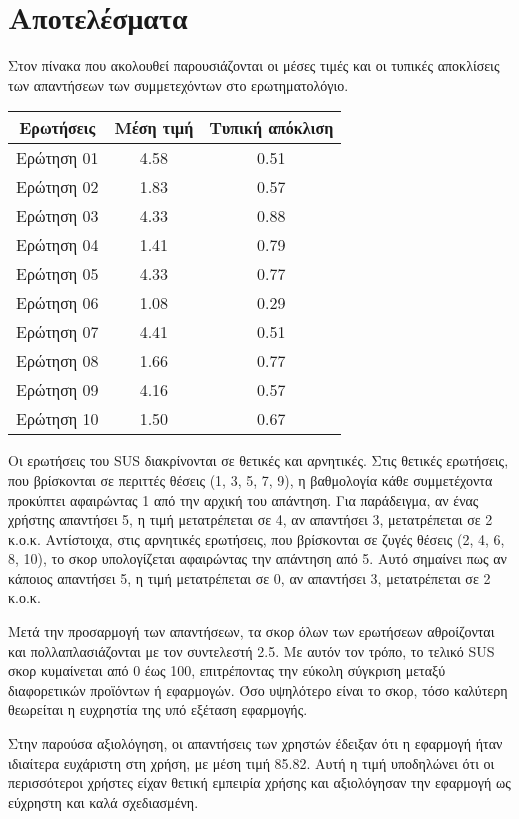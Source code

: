     \section{Αποτελέσματα}
        Στον πίνακα που ακολουθεί παρουσιάζονται οι μέσες τιμές και οι τυπικές αποκλίσεις των απαντήσεων των συμμετεχόντων στο ερωτηματολόγιο.
        \begin{table}[H] \noindent\centering \small
                \begin{tabular}{c|c|c}
                   \textbf{Ερωτήσεις} & \textbf{Μέση τιμή} & \textbf{Τυπική απόκλιση} \\
                    \midrule
                    Ερώτηση 01  & 4.58 & 0.51 \\
                    Ερώτηση 02  & 1.83 & 0.57 \\
                    Ερώτηση 03  & 4.33 & 0.88 \\
                    Ερώτηση 04  & 1.41 & 0.79 \\
                    Ερώτηση 05  & 4.33 & 0.77 \\
                    Ερώτηση 06  & 1.08 & 0.29 \\
                    Ερώτηση 07  & 4.41 & 0.51 \\
                    Ερώτηση 08  & 1.66 & 0.77 \\
                    Ερώτηση 09  & 4.16 & 0.57 \\
                    Ερώτηση 10 & 1.50 & 0.67 \\
                \end{tabular}
        \end{table}

        Οι ερωτήσεις του SUS διακρίνονται σε θετικές και αρνητικές. Στις θετικές ερωτήσεις, που βρίσκονται σε περιττές θέσεις (1, 3, 5, 7, 9), η βαθμολογία κάθε συμμετέχοντα προκύπτει αφαιρώντας 1 από την αρχική του απάντηση. Για παράδειγμα, αν ένας χρήστης απαντήσει 5, η τιμή μετατρέπεται σε 4, αν απαντήσει 3, μετατρέπεται σε 2 κ.ο.κ. Αντίστοιχα, στις αρνητικές ερωτήσεις, που βρίσκονται σε ζυγές θέσεις (2, 4, 6, 8, 10), το σκορ υπολογίζεται αφαιρώντας την απάντηση από 5. Αυτό σημαίνει πως αν κάποιος απαντήσει 5, η τιμή μετατρέπεται σε 0, αν απαντήσει 3, μετατρέπεται σε 2 κ.ο.κ.

        Μετά την προσαρμογή των απαντήσεων, τα σκορ όλων των ερωτήσεων αθροίζονται και πολλαπλασιάζονται με τον συντελεστή 2.5. Με αυτόν τον τρόπο, το τελικό SUS σκορ κυμαίνεται από 0 έως 100, επιτρέποντας την εύκολη σύγκριση μεταξύ διαφορετικών προϊόντων ή εφαρμογών. Όσο υψηλότερο είναι το σκορ, τόσο καλύτερη θεωρείται η ευχρηστία της υπό εξέταση εφαρμογής.

        Στην παρούσα αξιολόγηση, οι απαντήσεις των χρηστών έδειξαν ότι η εφαρμογή ήταν ιδιαίτερα ευχάριστη στη χρήση, με μέση τιμή 85.82. Αυτή η τιμή υποδηλώνει ότι οι περισσότεροι χρήστες είχαν θετική εμπειρία χρήσης και αξιολόγησαν την εφαρμογή ως εύχρηστη και καλά σχεδιασμένη.